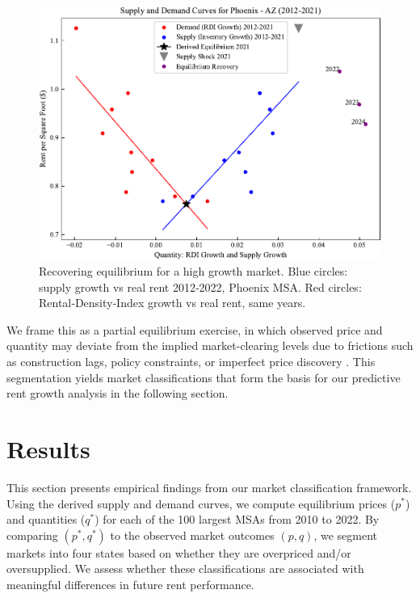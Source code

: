 \documentclass[APA,Times1COL]{WileyNJDv5} %
\begin{document}
\begin{figure}[htb!]
	\centering
	\includegraphics[]{phoenix_example.pdf}
	\caption{Recovering equilibrium for a high growth market.  
		Blue circles: supply growth vs real rent 2012‑2022, Phoenix MSA.  
		Red circles: Rental‑Density‑Index growth vs real rent, same years.  
}
	\label{fig:phoenix_mechanism}
\end{figure}

We frame this as a partial equilibrium exercise, in which observed price and quantity may deviate from the implied market-clearing levels due to frictions such as construction lags, policy constraints, or imperfect price discovery \cite{wheaton1991realestate, glaeser2019rethinking}. This segmentation yields market classifications that form the basis for our predictive rent growth analysis in the following section.

\section{Results}

This section presents empirical findings from our market classification framework. Using the derived supply and demand curves, we compute equilibrium prices (\( p^* \)) and quantities (\( q^* \)) for each of the 100 largest MSAs from 2010 to 2022. By comparing \( (p^*, q^*) \) to the observed market outcomes \( (p, q) \), we segment markets into four states based on whether they are overpriced and/or oversupplied. We assess whether these classifications are associated with meaningful differences in future rent performance.
\end{document}
